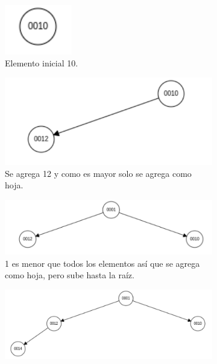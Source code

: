 \documentclass[12pt]{article}
\begin{document}
\begin{figure}
	\begin{subfigure}{.25\textwidth}
		\centering
		\includegraphics[width=.4\linewidth]{hp001}
		\caption{Elemento inicial 10.}
		\label{fig:sfig1}
	\end{subfigure}
	\begin{subfigure}{.3\textwidth}
		\centering
		\includegraphics[width=1.4\linewidth]{hp002}
		\caption{Se agrega 12 y como es mayor solo se agrega como hoja.}
		\label{fig:sfig2}
	\end{subfigure}
	\begin{subfigure}{.3\textwidth}
		\centering
		\includegraphics[width=1.8\linewidth]{hp003}
		\caption{1 es menor que todos los elementos así que se agrega como hoja, pero sube hasta la raíz.}
		\label{fig:sfig3}
	\end{subfigure}
	\begin{subfigure}{.6\textwidth}
		\centering
		\includegraphics[width=1.04\linewidth]{hp004}

\end{subfigure}
\end{figure}
\end{document}

